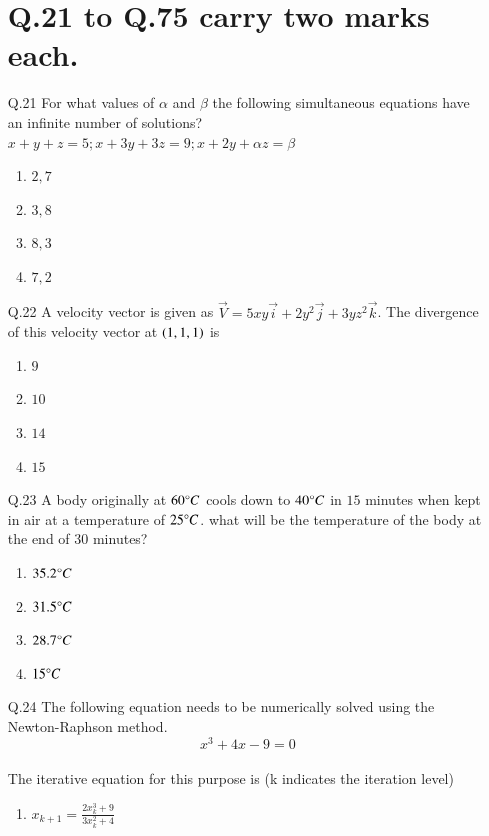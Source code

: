\documentclass[journal,12pt,onecolumn]{IEEEtran}
\theoremstyle{remark}
\begin{document}
\begin{enumerate}
		\section*{Q.21 to Q.75 carry two marks each.}
\item[Q.21] For what values of $\alpha$ and $\beta$ the following simultaneous equations have an infinite number of solutions?\\ $x+y+z=5;  x+3y+3z=9;  x+2y+\alpha z= \beta$
	\begin{enumerate}
                \item $2,7$
                \item $3,8$
                \item $8,3$
                \item $7,2$
        \end{enumerate}
\item[Q.22] A velocity vector is given as $\overrightarrow{V}= 5xy\overrightarrow{i}+2y^2\overrightarrow{j}+3yz^2\overrightarrow{k}$. The divergence of this velocity vector at $\left(1,1,1\right)$ is
	\begin{enumerate}
                \item $9$
                \item $10$
                \item $14$
                \item $15$
        \end{enumerate}
\item[Q.23] A body originally at $60{\degree}C$ cools down to $40{\degree}C$ in $15$ minutes when kept in air at a temperature of $25{\degree}C$. what will be the temperature of the body at the end of $30$ minutes?
	\begin{enumerate}
		\item $35.2{\degree}C$
                \item $31.5{\degree}C$
                \item $28.7{\degree}C$
                \item $15{\degree}C$
        \end{enumerate}
\item[Q.24] The following equation needs to be numerically solved using the Newton-Raphson method.\\ $$x^3+4x-9=0$$\\The iterative equation for this purpose is (k indicates the iteration level)
	\begin{enumerate}
		\item $x_{k+1}=\frac{2x_k^3+9}{3x_k^2+4}$

\end{enumerate}
\end{enumerate}
\end{document}
